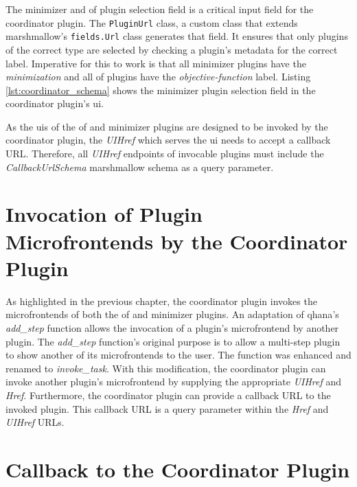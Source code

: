 \documentclass[
  a4paper,  %
  twoside,  %
  bibliography=totoc,
  headsepline,
  cleardoublepage=empty,
  parskip=half,
  draft=false
]{scrbook}
\begin{document}


The minimizer and \gls{of} plugin selection field is a critical input field for the coordinator plugin.
The \texttt{PluginUrl} class,  a custom class that extends marshmallow's \texttt{fields.Url} class generates that field.
It ensures that only plugins of the correct type are selected by checking a plugin's metadata for the correct label.
Imperative for this to work is that all minimizer plugins have the \emph{minimization} and all \gls{of} plugins have the \emph{objective-function} label.
Listing \ref{lst:coordinator_schema} shows the minimizer plugin selection field in the coordinator plugin's \gls{ui}.



As the \glspl{ui} of the \gls{of} and minimizer plugins are designed to be invoked by the coordinator plugin, the \emph{UIHref} which serves the \gls{ui} needs to accept a callback URL.
Therefore, all \emph{UIHref} endpoints of invocable plugins must include the \emph{CallbackUrlSchema} marshmallow schema as a query parameter.



\section{Invocation of Plugin Microfrontends by the Coordinator Plugin}
\label{sec:invocationOfPluginMicrofrontendsByTheCoordinatorPlugin}

As highlighted in the previous chapter, the coordinator plugin invokes the microfrontends of both the \gls{of} and minimizer plugins.
An adaptation of \gls{qhana}'s \emph{add\_step} function allows the invocation of a plugin's microfrontend by another plugin.
The \emph{add\_step} function's original purpose is to allow a multi-step plugin to show another of its microfrontends to the user.
The function was enhanced and renamed to \emph{invoke\_task}.
With this modification, the coordinator plugin can invoke another plugin's microfrontend by supplying the appropriate \emph{UIHref} and \emph{Href}.
Furthermore, the coordinator plugin can provide a callback URL to the invoked plugin.
This callback URL is a query parameter within the \emph{Href} and \emph{UIHref} URLs.

\section{Callback to the Coordinator Plugin}
\label{sec:implementationOfCallbacksToTheCoordinatorPlugin}
\end{document}
